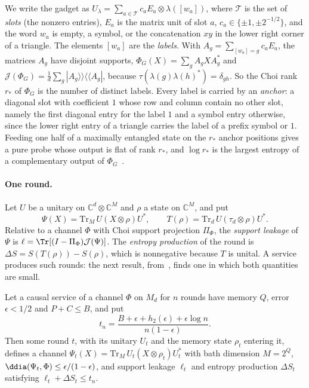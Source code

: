 We write the gadget as $U_\lambda=\sum_{a\in\mathcal T}c_aE_a\otimes\lambda([w_a])$, where $\mathcal T$ is the set of \emph{slots} (the nonzero
entries), $E_a$ is the matrix unit of slot $a$, $c_a\in\{\pm1,\pm2^{-1/2}\}$, and the word $w_a$ is empty, a symbol, or the concatenation $xy$ in the
lower right corner of a triangle. The elements $[w_a]$ are the \emph{labels}. With $A_g=\sum_{[w_a]=g}c_aE_a$, the matrices $A_g$ have disjoint
supports, $\Phi_G(X)=\sum_gA_gXA_g^*$ and $\mathcal J(\Phi_G)=\frac1d\sum_g|A_g\rangle\!\rangle\langle\!\langle A_g|$, because
$\tau(\lambda(g)\lambda(h)^*)=\delta_{gh}$. So the Choi rank $r_*$ of $\Phi_G$ is the number of distinct labels. Every label is carried by an
\emph{anchor}: a diagonal slot with coefficient $1$ whose row and column contain no other slot, namely the first diagonal entry for the label $1$
and a symbol entry otherwise, since the lower right entry of a triangle carries the label of a prefix symbol or $1$. Feeding one half of a maximally entangled
state on the $r_*$ anchor positions gives a pure probe whose output is flat of rank $r_*$, and $\log r_*$ is the largest entropy of a complementary
output of $\Phi_G$~\cite[Proposition~9.1]{DouglasMghirbiB}.

\paragraph{One round.} Let $U$ be a unitary on $\mathbb C^d\otimes\mathbb C^M$ and $\rho$ a state on $\mathbb C^M$, and put
\[
\Psi(X)=\mathrm{Tr}_M\,U(X\otimes\rho)U^*,\qquad T(\rho)=\mathrm{Tr}_d\,U(\tau_d\otimes\rho)U^* .
\]
Relative to a channel $\Phi$ with Choi support projection $\Pi_\Phi$, the \emph{support leakage} of $\Psi$ is
$\ell=\Tr[(I-\Pi_\Phi)\mathcal J(\Psi)]$. The \emph{entropy production} of the round is $\Delta S=S(T(\rho))-S(\rho)$, which is nonnegative because
$T$ is unital. A service produces such rounds: the next result, from~\cite{DouglasMghirbiB}, finds one in which both quantities are small.

\begin{theorem}\label{thm:extraction}
Let a causal service of a channel $\Phi$ on $M_d$ for $n$ rounds have memory $Q$, error $\epsilon<1/2$ and $P+C\le B$, and put
\[
t_n=\frac{B+\epsilon+h_2(\epsilon)+\epsilon\log n}{n(1-\epsilon)} .
\]
Then some round $t$, with its unitary $U_t$ and the memory state $\rho_t$ entering it, defines a channel $\Psi_t(X)=\mathrm{Tr}_M\,U_t(X\otimes\rho_t)U_t^*$
with bath dimension $M=2^Q$, $\ddia(\Psi_t,\Phi)\le\epsilon/(1-\epsilon)$, and support leakage $\ell_t$ and entropy production $\Delta S_t$ satisfying
$\ell_t+\Delta S_t\le t_n$.
\end{theorem}

